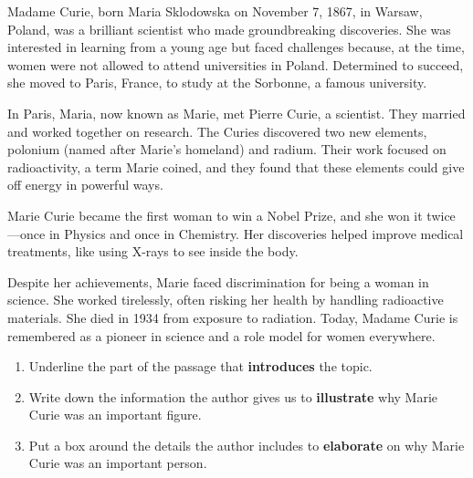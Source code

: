 \documentclass[12pt]{article}
\begin{document}
\vspace{1em}


\begin{tcolorbox}[colframe=black!60, colback=white, 
coltitle=black, colbacktitle=black!15, fonttitle=\bfseries\Large, 
title=Text: The Life of Marie Curie, halign title=center, left=10pt, right=10pt, top=10pt, bottom=15pt]
 

Madame Curie, born Maria Sklodowska on November 7, 1867, in Warsaw, Poland, was a brilliant scientist who made groundbreaking discoveries. She was interested in learning from a young age but faced challenges because, at the time, women were not allowed to attend universities in Poland. Determined to succeed, she moved to Paris, France, to study at the Sorbonne, a famous university.  

In Paris, Maria, now known as Marie, met Pierre Curie, a scientist. They married and worked together on research. The Curies discovered two new elements, polonium (named after Marie’s homeland) and radium. Their work focused on radioactivity, a term Marie coined, and they found that these elements could give off energy in powerful ways.  

Marie Curie became the first woman to win a Nobel Prize, and she won it twice—once in Physics and once in Chemistry. Her discoveries helped improve medical treatments, like using X-rays to see inside the body.  

Despite her achievements, Marie faced discrimination for being a woman in science. She worked tirelessly, often risking her health by handling radioactive materials. She died in 1934 from exposure to radiation. Today, Madame Curie is remembered as a pioneer in science and a role model for women everywhere.
\end{tcolorbox}

\vspace{1em}

\begin{tcolorbox}[colframe=black!60, colback=white, 
coltitle=black, colbacktitle=black!15, fonttitle=\bfseries\Large, 
title=Guided Practice, halign title=center, left=10pt, right=10pt, top=10pt, bottom=15pt]

\begin{enumerate}[itemsep=1em]
    \item Underline the part of the passage that \textbf{introduces} the topic.
    \item Write down the information the author gives us to \textbf{illustrate} why Marie Curie was an important figure.
\vspace{3cm}
    \item Put a box around the details the author includes to \textbf{elaborate} on why Marie Curie was an important person. 
\end{enumerate}
\end{tcolorbox}
\end{document}
